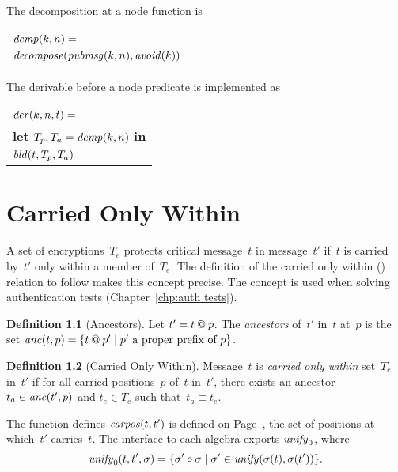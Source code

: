 \documentclass[12pt]{report}
\theoremstyle{definition}
\newtheorem{defn}{Definition}[chapter]
\newcommand{\pubmsg}{\fn{pubmsg}}
\newcommand{\avoid}{\fn{avoid}}
\begin{document}
The decomposition at a node function is
\begin{center}
\begin{tabular}{l}
$\operatorname{\mathit{dcmp}}(k,n)={}$\\
\quad$\fn{decompose}(\pubmsg(k,n),\avoid(k))$
\end{tabular}
\end{center}

The derivable before a node predicate is implemented as
\begin{center}
\begin{tabular}{l}
$\operatorname{\mathit{der}}(k,n,t)={}$\\
\quad\textbf{let} $T_p, T_a=\operatorname{\mathit{dcmp}}(k,n)$ \textbf{in}\\
\quad$\operatorname{\mathit{bld}}(t,T_p,T_a)$
\end{tabular}
\end{center}

\chapter{Carried Only Within}\label{chp:cow}

A set of encryptions~$T_e$ protects critical message~$t$ in
message~$t'$ if~$t$ is carried by~$t'$ only within a member of~$T_e$.
The definition of the carried only within ({\cow}) relation to follow makes
this concept precise.  The concept is used when solving authentication
tests (Chapter~\ref{chp:auth tests}).

\begin{defn}[Ancestors]
Let $t'=t\mathbin{@} p$.  The \emph{ancestors} of~$t'$
in~$t$ at~$p$ is the set $\operatorname{\mathit{anc}}(t,p)=\{t\mathbin{@} p'\mid \mbox{$p'$ a
  proper prefix of~$p$}\}$.
\end{defn}

\begin{defn}[Carried Only Within]\label{def:cow}
Message~$t$ is \emph{carried only within}
set~$T_e$ in~$t'$ if for all carried
positions~$p$ of~$t$ in~$t'$, there exists an
ancestor~$t_a\in\operatorname{\mathit{anc}}(t',p)$ and $t_e\in T_e$ such that~$t_a\equiv
t_e$.
\end{defn}

The function defines $\operatorname{\mathit{carpos}}(t,t')$ is defined on
Page~\pageref{def:carried positions}, the set of positions at
which~$t'$ carries~$t$.  The interface to each algebra exports
$\operatorname{\mathit{unify}}_0$, where
$$\operatorname{\mathit{unify}}_0(t,t',\sigma)=\{\sigma'\circ\sigma\mid
\sigma'\in\operatorname{\mathit{unify}}(\sigma(t),\sigma(t'))\}.$$
\end{document}
